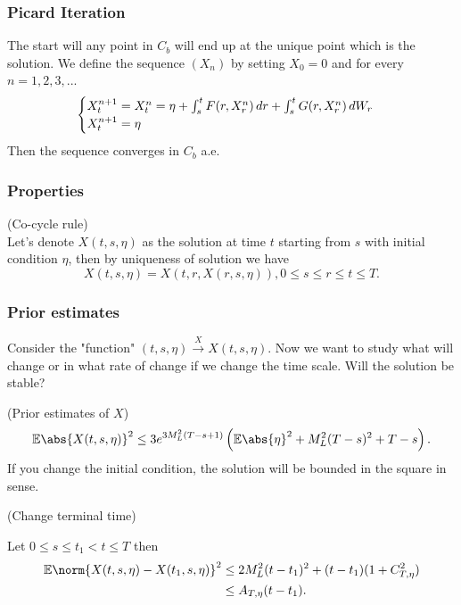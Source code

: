 \subsubsection{Picard Iteration}
\begin{prop}
The start will any point in $C_b$ will end up at the unique point which is the solution. We define the sequence $(X_n)$ by setting $X_0 = 0$ and for every $n = 1,2,3,...$
\begin{equation*}
    \begin{cases}
    X_t^{n+1} = X_t^n = \eta + \int_s^t F(r,X_r^n) \mathop{}\!d r+\int_s^t G(r,X_r^n) \mathop{}\!d W_r \\
    X_t^{n+1} = \eta
    \end{cases}
\end{equation*}
Then the sequence converges in $C_b$ a.e.
\end{prop}

\subsubsection{Properties}
\begin{lem}{(Co-cycle rule)}\\
Let's denote $X(t,s,\eta)$ as the solution at time $t$ starting from $s$ with initial condition $\eta$, then by uniqueness of solution we have
\begin{equation*}
    X(t,s,\eta) = X(t,r, X(r,s,\eta)), 0 \leq s \leq r \leq t \leq T.
\end{equation*}
\end{lem}

\subsubsection{Prior estimates}\label{Sec: prior_estimate}
Consider the "function" $(t,s, \eta) \xrightarrow{X} X(t,s,\eta)$. Now we want to study what will change or in what rate of change if we change the time scale. Will the solution be stable? 
\begin{lem}{(Prior estimates of $X$)}
\begin{equation*}
    \E\abs{X(t,s,\eta)}^2 \leq 3e^{3M_L^2(T-s+1)}\left( \E\abs{\eta}^2 + M_L^2(T-s)^2 + T-s \right).
\end{equation*}
If you change the initial condition, the solution will be bounded in the square in sense.
\end{lem}

\begin{lem}{(Change terminal time)}

Let $0\leq s \leq t_1 < t \leq T$ then
\begin{align*}
    \E\norm{X(t,s,\eta) - X(t_1, s, \eta)}^2 &\leq  2M_L^2(t-t_1)^2+(t-t_1)(1+C_{T,\eta}^2) \\
    &\leq A_{T,\eta}(t-t_1).
\end{align*}
\end{lem}


